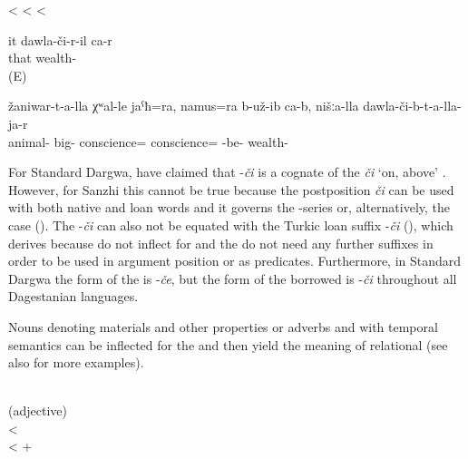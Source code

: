 \begin{exe}
	\ex	\label{ex:adjectivesWithCHIB_1}
	\begin{xlist}
		\TabPositions{10em,12em}
		\ex	{}  		\tab	<	\tab	{} 
		\ex	{}   \tab	<	\tab	{} 
		\ex	{}   \tab	<	\tab	{} 
	\end{xlist}

	\ex	\label{ex:She is rich}
	\gll	it dawla-či-r-il ca-r \\
		that	wealth-	 \\
	\glt	{} (E)
	
	\ex	\label{The animals had apparently more consciences thatn our rich (people).}
	\gll žaniwar-t-a-lla				χʷal-le		jaˁħ=ra,	namus=ra		b-už-ib ca-b,	nišːa-lla		dawla-či-b-t-a-lla-ja-r \\
	animal-	big-	conscience=		conscience=	-be-				wealth- \\
	\glt	{}
	
\end{exe}

For Standard Dargwa, \citealp[212]{AbdullaevEtAl2014} have claimed that -\textit{či} is a cognate of the  \textit{či} `on, above' . However, for Sanzhi this cannot be true because the postposition \textit{či} can be used with both native and loan words and it governs the -series or, alternatively, the  case (). The  -\textit{či} can also not be equated with the Turkic loan suffix -\textit{či} (), which derives   because  do not inflect for  and the   do not need any further suffixes in order to be used in argument position or as predicates. Furthermore, in Standard Dargwa the form of the  is -\textit{če}, but the form of the borrowed  is -\textit{či} throughout all Dagestanian languages.

Nouns denoting materials and other properties or adverbs and  with temporal semantics can be inflected for the  and then yield the meaning of relational   (see also  for more examples).
%
\begin{exe}
\ex	\label{ex:adjectivesWithLA}
		\TabPositions{12em}
		 		\tab	{}	 \\
		 				\tab	{}  (adjective)\\
		  <  \\
						<	   +   
\end{exe}


